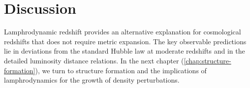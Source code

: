 \section{Discussion}

Lamphrodynamic redshift provides an alternative explanation for cosmological
redshifts that does not require metric expansion. The key observable
predictions lie in deviations from the standard Hubble law at moderate
redshifts and in the detailed luminosity distance relations. In the next
chapter (\cref{chap:structure-formation}), we turn to structure formation
and the implications of lamphrodynamics for the growth of density
perturbations.

\clearpage

